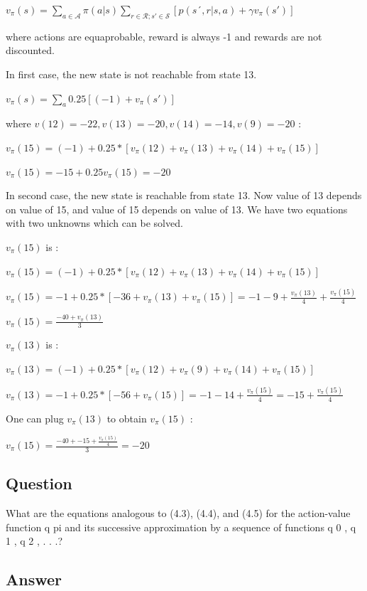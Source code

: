 \documentclass[11pt]{article}
\begin{document}
    $ v_\pi(s) = \sum_{a \in \mathcal{A}} \pi(a|s) \sum_{r \in \mathcal{R}; s' \in \mathcal{S}} [p(s´,r|s,a) + \gamma v_\pi (s')] $

    where actions are equaprobable, reward is always -1 and rewards are not discounted.

    In first case, the new state is not reachable from state 13.

    $ v_\pi(s) = \sum_{a} 0.25 [(-1) + v_\pi (s')] $

    where $ v(12)=-22, v(13)=-20, v(14)=-14, v(9) = -20 $ :

    $ v_\pi(15) = (-1) + 0.25 * [v_\pi (12) + v_\pi (13) + v_\pi (14) + v_\pi (15) ] $

    $ v_\pi(15) = -15 + 0.25 v_\pi (15) = -20 $

    In second case, the new state is reachable from state 13.
    Now value of 13 depends on value of 15, and value of 15 depends on value of 13.
    We have two equations with two unknowns which can be solved.

    $v_\pi(15)$ is :

    $ v_\pi(15) = (-1) + 0.25 * [v_\pi (12) + v_\pi (13) + v_\pi (14) + v_\pi (15) ] $

    $ v_\pi(15) = -1 + 0.25 * [-36 + v_\pi (13) + v_\pi (15) ] = -1 -9 + \frac{v_\pi (13)}{4}  + \frac{v_\pi (15)}{4}$

    $ v_\pi(15) = \frac{ -40 + v_\pi (13) }{3}$

    $v_\pi(13)$ is :

    $ v_\pi(13) = (-1) + 0.25 * [v_\pi (12) + v_\pi (9) + v_\pi (14) + v_\pi (15) ] $

    $ v_\pi(13) = -1 + 0.25 * [-56 + v_\pi (15) ] = -1 -14 + \frac{v_\pi (15)}{4} =  -15 + \frac{v_\pi (15)}{4} $

    One can plug $ v_\pi(13) $ to obtain $ v_\pi(15) $ :

    $ v_\pi(15) = \frac{ -40 + -15 + \frac{v_\pi (15)}{4} }{3} = -20$

    \subsection{Question}

    What are the equations analogous to (4.3), (4.4), and (4.5) for the action-value function q pi and its successive approximation by a sequence of functions q 0 , q 1 , q 2 , . . .?

    \subsection*{Answer}
\end{document}
